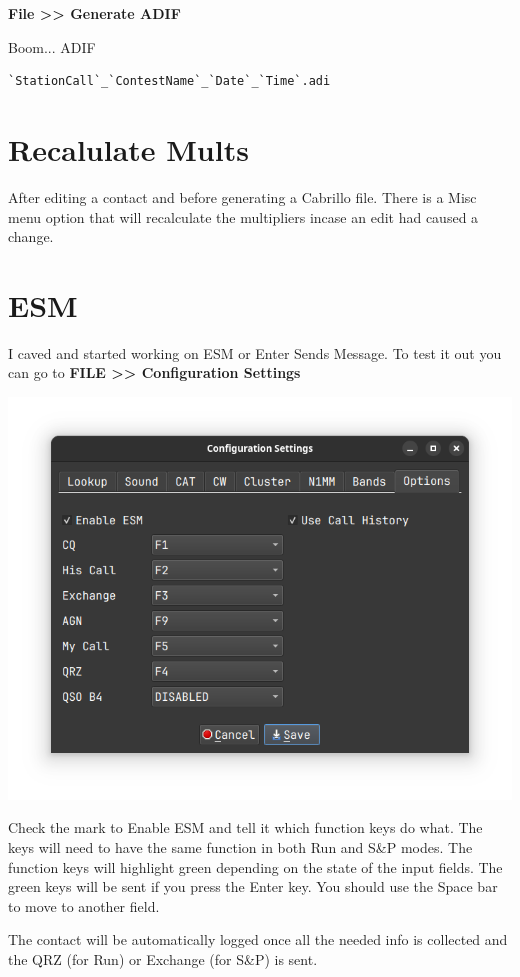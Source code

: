 \documentclass{article}
\begin{document}
\textbf{File >> Generate ADIF}

Boom... ADIF
\begin{verbatim}
`StationCall`_`ContestName`_`Date`_`Time`.adi
\end{verbatim}

\section{Recalulate Mults}

After editing a contact and before generating a Cabrillo file. There is a Misc menu option that will recalculate the multipliers incase an edit had caused a change.
\newpage
\section{ESM}

I caved and started working on ESM or Enter Sends Message. To test it out you can go to \textbf{FILE >> Configuration Settings}

\vspace{0.5cm}
\includegraphics[width=0.9\linewidth]{pic/configuration_options.png}
\vspace{0.5cm}

Check the mark to Enable ESM and tell it which function keys do what. The keys will need to have the same function in both Run and S\&P modes. The function keys will highlight green depending on the state of the input fields. The green keys will be sent if you press the Enter key. You should use the Space bar to move to another field.

The contact will be automatically logged once all the needed info is collected and the QRZ (for Run) or Exchange (for S\&P) is sent.
\end{document}
